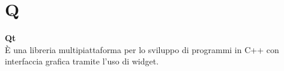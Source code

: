 \section{Q}

\textbf{Qt}\\
È una libreria multipiattaforma per lo sviluppo di programmi in C++ con interfaccia grafica tramite l'uso di widget.

\clearpage